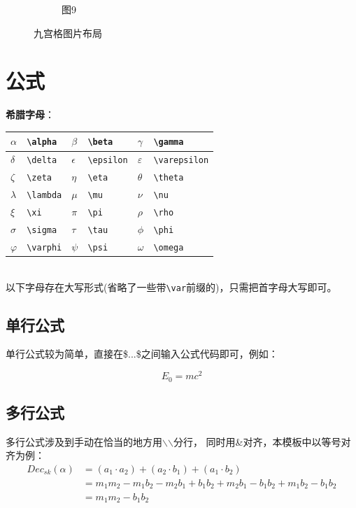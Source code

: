 \documentclass[12pt, a4paper, oneside]{ctexart}
\begin{document}
\begin{figure}[htbp]
\begin{subfigure}{0.3\textwidth}
        \caption{图9}
    \end{subfigure}

    \caption{九宫格图片布局}
\end{figure}

\newpage

\section{公式}
\textbf{希腊字母}：
\vspace{2mm} \\
\begin{tabular}{|l|l|l|l|l|l|}
    \hline
    $ \alpha $ & \verb|\alpha|  & $ \beta $    & \verb|\beta|    & $ \gamma $      & \verb|\gamma|      \\ \hline
    $ \delta $ & \verb|\delta|  & $ \epsilon $ & \verb|\epsilon| & $ \varepsilon $ & \verb|\varepsilon| \\ \hline
    $ \zeta  $ & \verb|\zeta|   & $ \eta $     & \verb|\eta|     & $ \theta $      & \verb|\theta|      \\ \hline
    $ \lambda$ & \verb|\lambda| & $ \mu  $     & \verb|\mu|      & $ \nu $         & \verb|\nu|         \\ \hline
    $ \xi    $ & \verb|\xi|     & $ \pi $      & \verb|\pi|      & $ \rho $        & \verb|\rho|        \\ \hline
    $ \sigma $ & \verb|\sigma|  & $ \tau $     & \verb|\tau|     & $ \phi $        & \verb|\phi|        \\ \hline
    $ \varphi$ & \verb|\varphi| & $ \psi $     & \verb|\psi|     & $ \omega $      & \verb|\omega|      \\ \hline
\end{tabular}
\vspace{2mm}  \\
以下字母存在大写形式(省略了一些带\verb|\var|前缀的)，只需把首字母大写即可。

\subsection{单行公式}
单行公式较为简单，直接在\$...\$之间输入公式代码即可，例如：\par
\begin{equation}
    E_0=mc^2
\end{equation}

\subsection{多行公式}
多行公式涉及到手动在恰当的地方用$\backslash$$\backslash$分行，
同时用\&对齐，本模板中以等号对齐为例：\\
\begin{equation}
    \begin{split}
        Dec_{sk}(\alpha)&=(a_1\cdot a_2)+(a_2\cdot b_1)+(a_1\cdot b_2)\\
        &= m_1m_2-m_1b_2-m_2b_1+b_1b_2+m_2b_1-b_1b_2+m_1b_2-b_1b_2\\
        &= m_1m_2-b_1b_2
    \end{split}
\end{equation}
\end{document}
